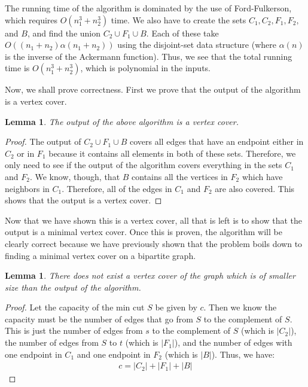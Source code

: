 \documentclass[psamsfonts]{amsart}
\newtheorem{lem}[thm]{Lemma}
\newenvironment{sol}{{\bfseries Solution}}{\qedsymbol}
\theoremstyle{definition}
\theoremstyle{remark}
\numberwithin{equation}{section}
\begin{document}
\begin{sol}
The running time of the algorithm is dominated by the use of Ford-Fulkerson, which requires $O(n_1^3 + n_2^3)$ time. We also have to create the sets $C_1, C_2, F_1, F_2,$ and $B$, and find the union $C_2 \cup F_1 \cup B$. Each of these take $O((n_1 + n_2) \alpha(n_1 + n_2))$ using the disjoint-set data structure (where $\alpha(n)$ is the inverse of the Ackermann function). Thus, we see that the total running time is $O(n_1^3 + n_2^3)$, which is polynomial in the inputs.

Now, we shall prove correctness. First we prove that the output of the algorithm is a vertex cover.
\begin{lem}
The output of the above algorithm is a vertex cover.
\end{lem}

\begin{proof}
The output of $C_2 \cup F_1 \cup B$ covers all edges that have an endpoint either in $C_2$ or in $F_1$ because it contains all elements in both of these sets. Therefore, we only need to see if the output of the algorithm covers everything in the sets $C_1$ and $F_2$. We know, though, that $B$ contains all the vertices in $F_2$ which have neighbors in $C_1$. Therefore, all of the edges in $C_1$ and $F_2$ are also covered. This shows that the output is a vertex cover.
\end{proof}

Now that we have shown this is a vertex cover, all that is left is to show that the output is a minimal vertex cover. Once this is proven, the algorithm will be clearly correct because we have previously shown that the problem boils down to finding a minimal vertex cover on a bipartite graph.

\begin{lem}
There does not exist a vertex cover of the graph which is of smaller size than the output of the algorithm.
\end{lem}

\begin{proof}
Let the capacity of the min cut $S$ be given by $c$. Then we know the capacity must be the number of edges that go from $S$ to the complement of $S$. This is just the number of edges from $s$ to the complement of $S$ (which is $|C_2|$), the number of edges from $S$ to $t$ (which is $|F_1|$), and the number of edges with one endpoint in $C_1$ and one endpoint in $F_2$ (which is $|B|$). Thus, we have:
\begin{eqnarray}
c = |C_2| + |F_1| + |B|
\end{eqnarray}


\end{proof}
\end{sol}
\end{document}
